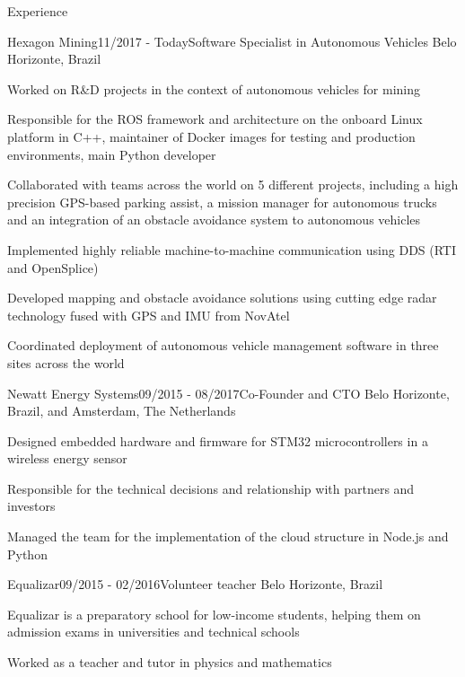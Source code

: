 \documentclass[14pt, a4paper]{resume} %
\begin{document}
\begin{rSection}{Experience}


\begin{rSubsection}{Hexagon Mining}{11/2017 - Today}{\normalfont Software Specialist in Autonomous Vehicles}{ \normalfont Belo Horizonte, Brazil}
	\item Worked on R\&D projects in the context of autonomous vehicles for mining
 	\item Responsible for the ROS framework and architecture on the onboard Linux platform in C++, maintainer of Docker images for testing and production environments, main Python developer
 	\item Collaborated with teams across the world on 5 different projects, including a high precision GPS-based parking assist, a mission manager for autonomous trucks and an integration of an obstacle avoidance system to autonomous vehicles 
 	\item Implemented highly reliable machine-to-machine communication using DDS (RTI and OpenSplice)
 	\item Developed mapping and obstacle avoidance solutions using cutting edge radar technology fused with GPS and IMU from NovAtel
 	\item Coordinated deployment of autonomous vehicle management software in three sites across the world
\end{rSubsection}

\begin{rSubsection}{Newatt Energy Systems}{09/2015 - 08/2017}{\normalfont Co-Founder and CTO}{ \normalfont Belo Horizonte, Brazil, and Amsterdam, The Netherlands}
 	\item Designed embedded hardware and firmware for STM32 microcontrollers in a wireless energy sensor
 	\item Responsible for the technical decisions and relationship with partners and investors
 	\item Managed the team for the implementation of the cloud structure in Node.js and Python

\end{rSubsection}

\begin{rSubsection}{Equalizar}{09/2015 - 02/2016}{\normalfont Volunteer teacher}{ \normalfont Belo Horizonte, Brazil}
	\item Equalizar is a preparatory school for low-income students, helping them on admission exams in universities and technical schools
	\item Worked as a teacher and tutor in physics and mathematics
\end{rSubsection}



\end{rSection}
\end{document}
